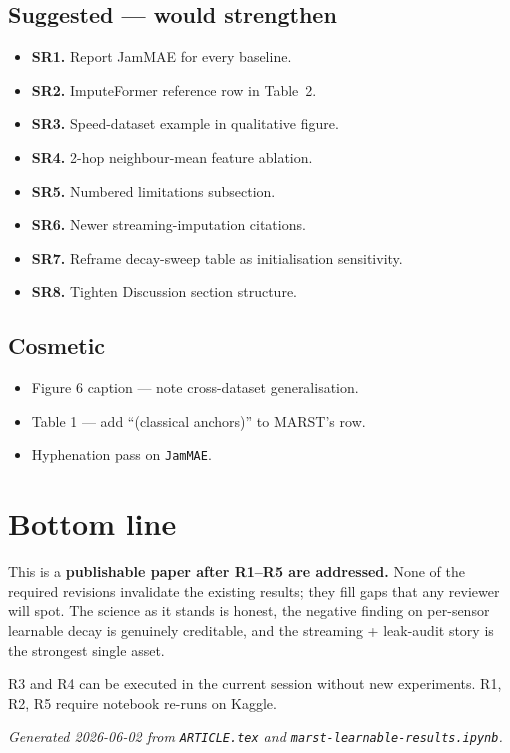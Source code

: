 \documentclass[11pt]{article}
\begin{document}
\subsection*{Suggested --- would strengthen}
\begin{itemize}
\item[\fbox{\phantom{X}}] \textbf{SR1.} Report JamMAE for every baseline.
\item[\fbox{\phantom{X}}] \textbf{SR2.} ImputeFormer reference row in Table~2.
\item[\fbox{\phantom{X}}] \textbf{SR3.} Speed-dataset example in qualitative figure.
\item[\fbox{\phantom{X}}] \textbf{SR4.} 2-hop neighbour-mean feature ablation.
\item[\fbox{\phantom{X}}] \textbf{SR5.} Numbered limitations subsection.
\item[\fbox{\phantom{X}}] \textbf{SR6.} Newer streaming-imputation citations.
\item[\fbox{\phantom{X}}] \textbf{SR7.} Reframe decay-sweep table as initialisation sensitivity.
\item[\fbox{\phantom{X}}] \textbf{SR8.} Tighten Discussion section structure.
\end{itemize}

\subsection*{Cosmetic}
\begin{itemize}
\item[\fbox{\phantom{X}}] Figure 6 caption --- note cross-dataset generalisation.
\item[\fbox{\phantom{X}}] Table 1 --- add ``(classical anchors)'' to MARST's row.
\item[\fbox{\phantom{X}}] Hyphenation pass on \texttt{JamMAE}.
\end{itemize}

\section{Bottom line}

This is a \textbf{publishable paper after R1--R5 are addressed.}  None
of the required revisions invalidate the existing results; they fill
gaps that any reviewer will spot.  The science as it stands is honest,
the negative finding on per-sensor learnable decay is genuinely
creditable, and the streaming + leak-audit story is the strongest
single asset.

R3 and R4 can be executed in the current session without new
experiments.  R1, R2, R5 require notebook re-runs on Kaggle.

\bigskip\noindent
\textit{Generated 2026-06-02 from \texttt{ARTICLE.tex} and
\texttt{marst-learnable-results.ipynb}.}
\end{document}
